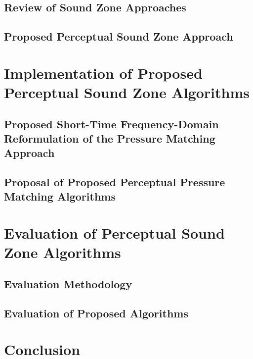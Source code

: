 \documentclass[10pt,twoside,openright,titlepage]{ce}
\begin{document}
\section{Review of Sound Zone Approaches}
\label{ch:sound_zone:approaches}

\newpage
\section{Proposed Perceptual Sound Zone Approach}
\label{ch:sound_zone:approach_selection}

\newpage

\chapter{Implementation of Proposed Perceptual Sound Zone Algorithms}
\label{ch:perceptual_sound_zone}

\newpage
\section{Proposed Short-Time Frequency-Domain Reformulation of the Pressure Matching Approach}
\label{ch:perceptual_sound_zone:stft}

\newpage
\section{Proposal of Proposed Perceptual Pressure Matching Algorithms}
\label{ch:perceptual_sound_zone:perceptual_minimization}

\newpage

\chapter{Evaluation of Perceptual Sound Zone Algorithms}
\label{ch:results}

\newpage
\section{Evaluation Methodology}
\label{ch:results:methodology}

\section{Evaluation of Proposed Algorithms}
\label{ch:results:evaluation}

\newpage

\chapter{Conclusion}
\label{ch:conclusion}
\end{document}
